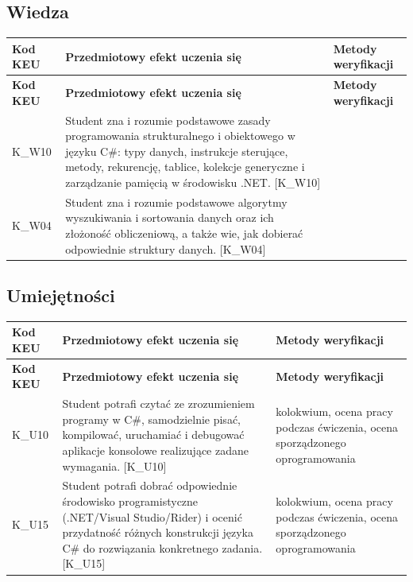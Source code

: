 \documentclass[12pt, a4paper]{article}
\newcommand{\thdrule}{\noalign{\global\setlength{\extrarowheight}{0pt}}}
\newcommand{\thdend}{\noalign{\global\setlength{\extrarowheight}{3pt}}}
\begin{document}
\subsection*{Wiedza}
{\scriptsize
\begin{longtable}{m{1.6cm}m{9.0cm}m{4.2cm}}
\thdrule\toprule
\rowcolor{pjatkRed} {\color{white}\footnotesize\textbf{\vphantom{Ag}Kod KEU}} & {\color{white}\footnotesize\textbf{\vphantom{Ag}Przedmiotowy efekt uczenia się}} & {\color{white}\footnotesize\textbf{\vphantom{Ag}Metody weryfikacji}} \\
\midrule\thdend
\endfirsthead
\thdrule\toprule
\rowcolor{pjatkRed} {\color{white}\footnotesize\textbf{\vphantom{Ag}Kod KEU}} & {\color{white}\footnotesize\textbf{\vphantom{Ag}Przedmiotowy efekt uczenia się}} & {\color{white}\footnotesize\textbf{\vphantom{Ag}Metody weryfikacji}} \\
\midrule\thdend
\endhead
  \rowcolor{tableRowLight} K\_W10 & Student zna i rozumie podstawowe zasady programowania strukturalnego i obiektowego w języku C\#: typy danych, instrukcje sterujące, metody, rekurencję, tablice, kolekcje generyczne i zarządzanie pamięcią w środowisku .NET. {[}K\_W10{]} &  \\
  \rowcolor{tableRowAlt} K\_W04 & Student zna i rozumie podstawowe algorytmy wyszukiwania i sortowania danych oraz ich złożoność obliczeniową, a także wie, jak dobierać odpowiednie struktury danych. {[}K\_W04{]} &  \\
\bottomrule
\end{longtable}}

\subsection*{Umiejętności}
{\scriptsize
\begin{longtable}{m{1.6cm}m{9.0cm}m{4.2cm}}
\thdrule\toprule
\rowcolor{pjatkRed} {\color{white}\footnotesize\textbf{\vphantom{Ag}Kod KEU}} & {\color{white}\footnotesize\textbf{\vphantom{Ag}Przedmiotowy efekt uczenia się}} & {\color{white}\footnotesize\textbf{\vphantom{Ag}Metody weryfikacji}} \\
\midrule\thdend
\endfirsthead
\thdrule\toprule
\rowcolor{pjatkRed} {\color{white}\footnotesize\textbf{\vphantom{Ag}Kod KEU}} & {\color{white}\footnotesize\textbf{\vphantom{Ag}Przedmiotowy efekt uczenia się}} & {\color{white}\footnotesize\textbf{\vphantom{Ag}Metody weryfikacji}} \\
\midrule\thdend
\endhead
  \rowcolor{tableRowLight} K\_U10 & Student potrafi czytać ze zrozumieniem programy w C\#, samodzielnie pisać, kompilować, uruchamiać i debugować aplikacje konsolowe realizujące zadane wymagania. {[}K\_U10{]} & kolokwium, ocena pracy podczas ćwiczenia, ocena sporządzonego oprogramowania \\
  \rowcolor{tableRowAlt} K\_U15 & Student potrafi dobrać odpowiednie środowisko programistyczne (.NET/Visual Studio/Rider) i ocenić przydatność różnych konstrukcji języka C\# do rozwiązania konkretnego zadania. {[}K\_U15{]} & kolokwium, ocena pracy podczas ćwiczenia, ocena sporządzonego oprogramowania \\
\bottomrule
\end{longtable}}
\end{document}
